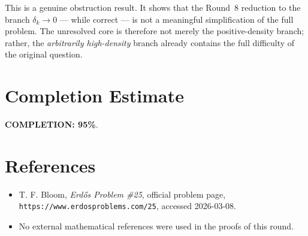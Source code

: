 This is a genuine obstruction result.  It shows that the Round~8 reduction to the branch $\delta_k\to 0$ --- while correct --- is not a meaningful simplification of the full problem.  The unresolved core is therefore not merely the positive-density branch; rather, the \emph{arbitrarily high-density} branch already contains the full difficulty of the original question.

\section{Completion Estimate}
\textbf{COMPLETION: 95\%}.

\section{References}
\begin{itemize}
\item T. F. Bloom, \emph{Erd\H{o}s Problem \#25}, official problem page, \texttt{https://www.erdosproblems.com/25}, accessed 2026-03-08.
\item No external mathematical references were used in the proofs of this round.
\end{itemize}
